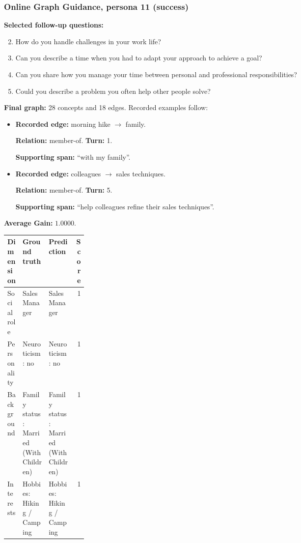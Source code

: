 \documentclass{ieeeaccess}
\begin{document}
\begin{multicols*}{2}
\subsubsection{Online Graph Guidance, persona 11 (success)}
\noindent\textbf{Selected follow-up questions:}\par\nopagebreak[4]
\begin{enumerate}
\setcounter{enumi}{1}
\item How do you handle challenges in your work life?
\item Can you describe a time when you had to adapt your approach to achieve a goal?
\item Can you share how you manage your time between personal and professional responsibilities?
\item Could you describe a problem you often help other people solve?
\end{enumerate}
\noindent\textbf{Final graph:} 28 concepts and 18 edges. Recorded examples follow:\par\nopagebreak[4]
\begin{itemize}
\item \textbf{Recorded edge:} morning hike $\rightarrow$ family.
\par\textbf{Relation:} member-of. \textbf{Turn:} 1.
\par\textbf{Supporting span:} ``with my family''.
\item \textbf{Recorded edge:} colleagues $\rightarrow$ sales techniques.
\par\textbf{Relation:} member-of. \textbf{Turn:} 5.
\par\textbf{Supporting span:} ``help colleagues refine their sales techniques''.
\end{itemize}
\noindent\begin{minipage}{\linewidth}
\noindent\textbf{Average Gain:} $1.0000$.\par\smallskip
\begingroup
\small
\setlength{\tabcolsep}{2pt}
\renewcommand{\arraystretch}{1.12}
\noindent\begin{tabularx}{\linewidth}{@{}p{0.19\linewidth}>{\raggedright\arraybackslash}X>{\raggedright\arraybackslash}Xr@{}}
\toprule
Dimension & Ground truth & Prediction & Score \\
\midrule
Social role & Sales Manager & Sales Manager & 1 \\
\addlinespace[2pt]
Personality & Neuroticism: no & Neuroticism: no & 1 \\
\addlinespace[2pt]
Background & Family status: Married (With Children) & Family status: Married (With Children) & 1 \\
\addlinespace[2pt]
Interests & Hobbies: Hiking / Camping & Hobbies: Hiking / Camping & 1 \\
\bottomrule
\end{tabularx}\par
\endgroup
\end{minipage}\par\medskip

\end{multicols*}
\end{document}
